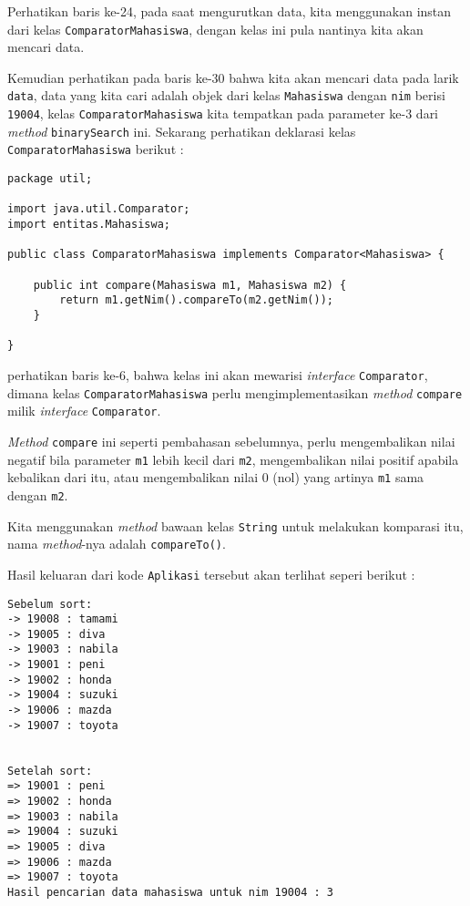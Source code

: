 Perhatikan baris ke-24, pada saat mengurutkan data, kita menggunakan instan dari kelas \texttt{ComparatorMahasiswa}, dengan kelas ini pula nantinya kita akan mencari data. 

Kemudian perhatikan pada baris ke-30 bahwa kita akan mencari data pada larik \texttt{data}, data yang kita cari adalah objek dari kelas \texttt{Mahasiswa} dengan \texttt{nim} berisi \texttt{19004}, kelas \texttt{ComparatorMahasiswa} kita tempatkan pada parameter ke-3 dari \textit{method} \texttt{binarySearch} ini. Sekarang perhatikan deklarasi kelas \texttt{ComparatorMahasiswa} berikut :

\begin{lstlisting}
package util;

import java.util.Comparator;
import entitas.Mahasiswa;

public class ComparatorMahasiswa implements Comparator<Mahasiswa> {

    public int compare(Mahasiswa m1, Mahasiswa m2) {
        return m1.getNim().compareTo(m2.getNim());
    }
    
}
\end{lstlisting}

perhatikan baris ke-6, bahwa kelas ini akan mewarisi \textit{interface} \texttt{Comparator}, dimana kelas \texttt{ComparatorMahasiswa} perlu mengimplementasikan \textit{method} \texttt{compare} milik \textit{interface} \texttt{Comparator}.

\textit{Method} \texttt{compare} ini seperti pembahasan sebelumnya, perlu mengembalikan nilai negatif bila parameter \texttt{m1} lebih kecil dari \texttt{m2}, mengembalikan nilai positif apabila kebalikan dari itu, atau mengembalikan nilai 0 (nol) yang artinya \texttt{m1} sama dengan \texttt{m2}.

Kita menggunakan \textit{method} bawaan kelas \texttt{String} untuk melakukan komparasi itu, nama \textit{method}-nya adalah \texttt{compareTo()}.

Hasil keluaran dari kode \texttt{Aplikasi} tersebut akan terlihat seperi berikut :

\begin{lstlisting}
Sebelum sort:
-> 19008 : tamami
-> 19005 : diva
-> 19003 : nabila
-> 19001 : peni
-> 19002 : honda
-> 19004 : suzuki 
-> 19006 : mazda
-> 19007 : toyota


Setelah sort:
=> 19001 : peni
=> 19002 : honda
=> 19003 : nabila
=> 19004 : suzuki
=> 19005 : diva
=> 19006 : mazda
=> 19007 : toyota
Hasil pencarian data mahasiswa untuk nim 19004 : 3
\end{lstlisting}

